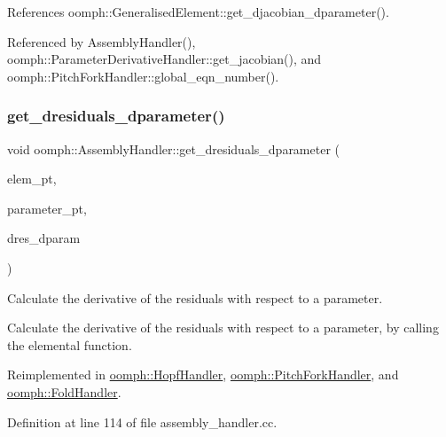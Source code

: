 References oomph\+::\+Generalised\+Element\+::get\+\_\+djacobian\+\_\+dparameter().



Referenced by Assembly\+Handler(), oomph\+::\+Parameter\+Derivative\+Handler\+::get\+\_\+jacobian(), and oomph\+::\+Pitch\+Fork\+Handler\+::global\+\_\+eqn\+\_\+number().

\mbox{\label{classoomph_1_1AssemblyHandler_a2ee980ccabe0ad82f98e694eecf270bb}} 
\subsubsection{\texorpdfstring{get\+\_\+dresiduals\+\_\+dparameter()}{get\_dresiduals\_dparameter()}}
{\footnotesize\ttfamily void oomph\+::\+Assembly\+Handler\+::get\+\_\+dresiduals\+\_\+dparameter (\begin{DoxyParamCaption}\item[{\hyperlink{classoomph_1_1GeneralisedElement}{Generalised\+Element} $\ast$const \&}]{elem\+\_\+pt,  }\item[{double $\ast$const \&}]{parameter\+\_\+pt,  }\item[{\hyperlink{classoomph_1_1Vector}{Vector}$<$ double $>$ \&}]{dres\+\_\+dparam }\end{DoxyParamCaption})\hspace{0.3cm}{\ttfamily [virtual]}}



Calculate the derivative of the residuals with respect to a parameter. 

Calculate the derivative of the residuals with respect to a parameter, by calling the elemental function. 

Reimplemented in \hyperlink{classoomph_1_1HopfHandler_a2953368ecc48dc22f8ea1f563064ece2}{oomph\+::\+Hopf\+Handler}, \hyperlink{classoomph_1_1PitchForkHandler_a6510803afcbcfce1ae5b1c1c5d82a541}{oomph\+::\+Pitch\+Fork\+Handler}, and \hyperlink{classoomph_1_1FoldHandler_ad98b98488b683fa3ad9497b662e6e5b6}{oomph\+::\+Fold\+Handler}.



Definition at line 114 of file assembly\+\_\+handler.\+cc.



